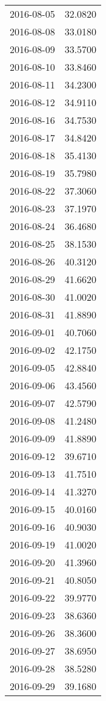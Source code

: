 \begin{tabular}{lr}
2016-08-05 &     32.0820 \\
2016-08-08 &     33.0180 \\
2016-08-09 &     33.5700 \\
2016-08-10 &     33.8460 \\
2016-08-11 &     34.2300 \\
2016-08-12 &     34.9110 \\
2016-08-16 &     34.7530 \\
2016-08-17 &     34.8420 \\
2016-08-18 &     35.4130 \\
2016-08-19 &     35.7980 \\
2016-08-22 &     37.3060 \\
2016-08-23 &     37.1970 \\
2016-08-24 &     36.4680 \\
2016-08-25 &     38.1530 \\
2016-08-26 &     40.3120 \\
2016-08-29 &     41.6620 \\
2016-08-30 &     41.0020 \\
2016-08-31 &     41.8890 \\
2016-09-01 &     40.7060 \\
2016-09-02 &     42.1750 \\
2016-09-05 &     42.8840 \\
2016-09-06 &     43.4560 \\
2016-09-07 &     42.5790 \\
2016-09-08 &     41.2480 \\
2016-09-09 &     41.8890 \\
2016-09-12 &     39.6710 \\
2016-09-13 &     41.7510 \\
2016-09-14 &     41.3270 \\
2016-09-15 &     40.0160 \\
2016-09-16 &     40.9030 \\
2016-09-19 &     41.0020 \\
2016-09-20 &     41.3960 \\
2016-09-21 &     40.8050 \\
2016-09-22 &     39.9770 \\
2016-09-23 &     38.6360 \\
2016-09-26 &     38.3600 \\
2016-09-27 &     38.6950 \\
2016-09-28 &     38.5280 \\
2016-09-29 &     39.1680 \\

\end{tabular}
